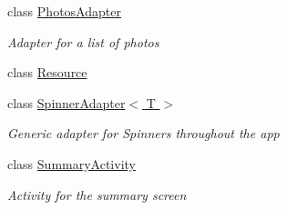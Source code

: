 \begin{DoxyCompactItemize}
class \hyperlink{class_field_service_1_1_android_1_1_photos_adapter}{Photos\+Adapter}
\begin{DoxyCompactList}\small\item\em Adapter for a list of photos \end{DoxyCompactList}\item 
class \hyperlink{class_field_service_1_1_android_1_1_resource}{Resource}
\item 
class \hyperlink{class_field_service_1_1_android_1_1_spinner_adapter_3_01_t_01_4}{Spinner\+Adapter$<$ T $>$}
\begin{DoxyCompactList}\small\item\em Generic adapter for Spinners throughout the app \end{DoxyCompactList}\item 
class \hyperlink{class_field_service_1_1_android_1_1_summary_activity}{Summary\+Activity}
\begin{DoxyCompactList}\small\item\em Activity for the summary screen \end{DoxyCompactList}\end{DoxyCompactItemize}
